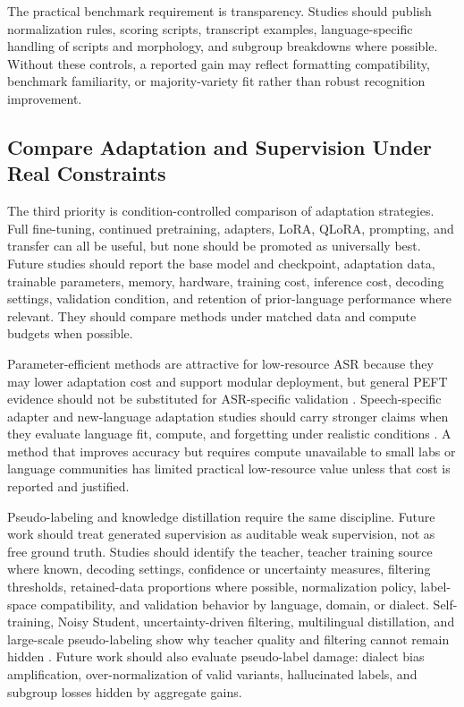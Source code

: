 \documentclass[pdflatex,sn-basic]{sn-jnl}
\theoremstyle{thmstyleone}
\theoremstyle{thmstyletwo}
\theoremstyle{thmstylethree}
\begin{document}
The practical benchmark requirement is transparency. Studies should publish normalization rules, scoring scripts, transcript examples, language-specific handling of scripts and morphology, and subgroup breakdowns where possible. Without these controls, a reported gain may reflect formatting compatibility, benchmark familiarity, or majority-variety fit rather than robust recognition improvement.

\subsection{Compare Adaptation and Supervision Under Real Constraints}

The third priority is condition-controlled comparison of adaptation strategies. Full fine-tuning, continued pretraining, adapters, LoRA, QLoRA, prompting, and transfer can all be useful, but none should be promoted as universally best. Future studies should report the base model and checkpoint, adaptation data, trainable parameters, memory, hardware, training cost, inference cost, decoding settings, validation condition, and retention of prior-language performance where relevant. They should compare methods under matched data and compute budgets when possible.

Parameter-efficient methods are attractive for low-resource ASR because they may lower adaptation cost and support modular deployment, but general PEFT evidence should not be substituted for ASR-specific validation \citep{pmlr-v97-houlsby19a,hu2022lora,dettmers2023qlora}. Speech-specific adapter and new-language adaptation studies should carry stronger claims when they evaluate language fit, compute, and forgetting under realistic conditions \citep{udupa24_interspeech,qian24_interspeech}. A method that improves accuracy but requires compute unavailable to small labs or language communities has limited practical low-resource value unless that cost is reported and justified.

Pseudo-labeling and knowledge distillation require the same discipline. Future work should treat generated supervision as auditable weak supervision, not as free ground truth. Studies should identify the teacher, teacher training source where known, decoding settings, confidence or uncertainty measures, filtering thresholds, retained-data proportions where possible, normalization policy, label-space compatibility, and validation behavior by language, domain, or dialect. Self-training, Noisy Student, uncertainty-driven filtering, multilingual distillation, and large-scale pseudo-labeling show why teacher quality and filtering cannot remain hidden \citep{park20d_interspeech,khurana2020dust,leal21_interspeech,bhogale24_interspeech}. Future work should also evaluate pseudo-label damage: dialect bias amplification, over-normalization of valid variants, hallucinated labels, and subgroup losses hidden by aggregate gains.
\end{document}
